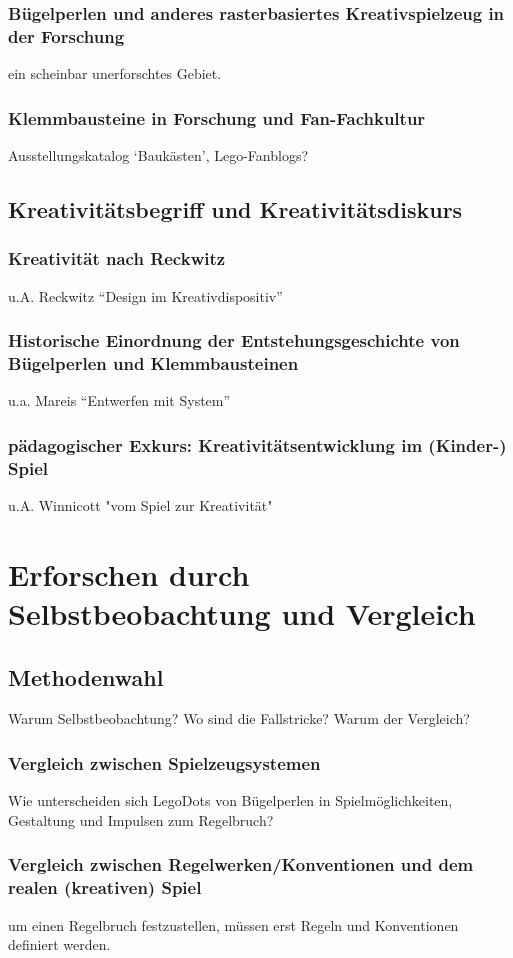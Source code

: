 \documentclass[11pt,a4paper,twoside]{scrreprt}
\begin{document}
		\subsection{Bügelperlen und anderes rasterbasiertes Kreativspielzeug in der Forschung}
		ein scheinbar unerforschtes Gebiet.
		\subsection{Klemmbausteine in Forschung und Fan-Fachkultur}
		Ausstellungskatalog `Baukästen', Lego-Fanblogs?

	\section{Kreativitätsbegriff und Kreativitätsdiskurs}
		\subsection{Kreativität nach Reckwitz}
		u.A. Reckwitz ``Design im Kreativdispositiv''
		\subsection{Historische Einordnung der Entstehungsgeschichte von Bügelperlen und Klemmbausteinen}
		u.a. Mareis ``Entwerfen mit System''
		\subsection{pädagogischer Exkurs: Kreativitätsentwicklung im (Kinder-) Spiel}
		u.A. Winnicott "vom Spiel zur Kreativität"



\chapter{Erforschen durch Selbstbeobachtung und Vergleich}
	\section{Methodenwahl}
	Warum Selbstbeobachtung? Wo sind die Fallstricke? Warum der Vergleich? 
		\subsection{Vergleich zwischen Spielzeugsystemen}
		Wie unterscheiden sich LegoDots von Bügelperlen in Spielmöglichkeiten, Gestaltung und Impulsen zum Regelbruch?
		\subsection{Vergleich zwischen Regelwerken/Konventionen und dem realen (kreativen) Spiel}
		um einen Regelbruch festzustellen, müssen erst Regeln und Konventionen definiert werden.
\end{document}
